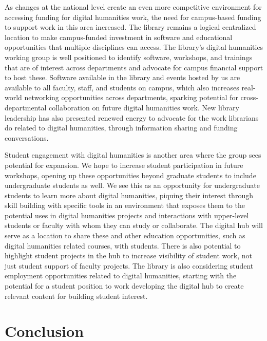 \documentclass[final]{anthology-ch}
\begin{document}
As changes at the national level create an even more competitive environment for accessing funding for digital humanities work, the need for campus-based funding to support work in this area increased. The library remains a logical centralized location to make campus-funded investment in software and educational opportunities that multiple disciplines can access. The library's digital humanities working group is well positioned to identify software, workshops, and trainings that are of interest across departments and advocate for campus financial support to host these. Software available in the library and events hosted by us are available to all faculty, staff, and students on campus, which also increases real-world networking opportunities across departments, sparking potential for cross-departmental collaboration on future digital humanities work. New library leadership has also presented renewed energy to advocate for the work librarians do related to digital humanities, through information sharing and funding conversations.

Student engagement with digital humanities is another area where the group sees potential for expansion. We hope to increase student participation in future workshops, opening up these opportunities beyond graduate students to include undergraduate students as well. We see this as an opportunity for undergraduate students to learn more about digital humanities, piquing their interest through skill building with specific tools in an environment that exposes them to the potential uses in digital humanities projects and interactions with upper-level students or faculty with whom they can study or collaborate. The digital hub will serve as a location to share these and other education opportunities, such as digital humanities related courses, with students. There is also potential to highlight student projects in the hub to increase visibility of student work, not just student support of faculty projects. The library is also considering student employment opportunities related to digital humanities, starting with the potential for a student position to work developing the digital hub to create relevant content for building student interest.

\section{Conclusion} \label{sec:conclusion}
\end{document}
